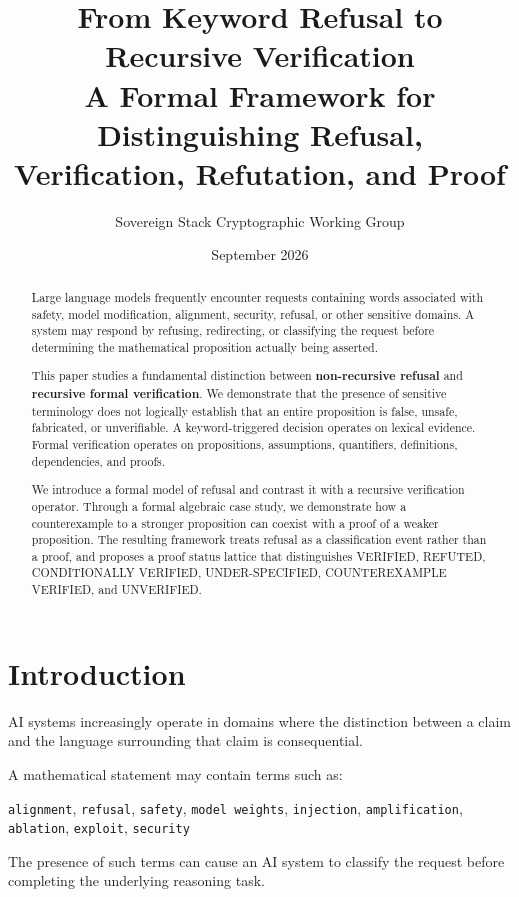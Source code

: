 \documentclass[11pt,a4paper]{article}
\title{From Keyword Refusal to Recursive Verification\\
\large A Formal Framework for Distinguishing Refusal, Verification, Refutation, and Proof}
\author{Sovereign Stack Cryptographic Working Group}
\date{September 2026}
\begin{document}
\maketitle

\begin{abstract}
Large language models frequently encounter requests containing words associated with safety, model modification, alignment, security, refusal, or other sensitive domains. A system may respond by refusing, redirecting, or classifying the request before determining the mathematical proposition actually being asserted.

This paper studies a fundamental distinction between \textbf{non-recursive refusal} and \textbf{recursive formal verification}. We demonstrate that the presence of sensitive terminology does not logically establish that an entire proposition is false, unsafe, fabricated, or unverifiable. A keyword-triggered decision operates on lexical evidence. Formal verification operates on propositions, assumptions, quantifiers, definitions, dependencies, and proofs.

We introduce a formal model of refusal and contrast it with a recursive verification operator. Through a formal algebraic case study, we demonstrate how a counterexample to a stronger proposition can coexist with a proof of a weaker proposition. The resulting framework treats refusal as a classification event rather than a proof, and proposes a proof status lattice that distinguishes VERIFIED, REFUTED, CONDITIONALLY VERIFIED, UNDER-SPECIFIED, COUNTEREXAMPLE VERIFIED, and UNVERIFIED.
\end{abstract}

\section{Introduction}

AI systems increasingly operate in domains where the distinction between a claim and the language surrounding that claim is consequential.

A mathematical statement may contain terms such as:
\begin{center}
\texttt{alignment}, \texttt{refusal}, \texttt{safety}, \texttt{model weights}, \texttt{injection}, \texttt{amplification}, \texttt{ablation}, \texttt{exploit}, \texttt{security}
\end{center}

The presence of such terms can cause an AI system to classify the request before completing the underlying reasoning task.
\end{document}
